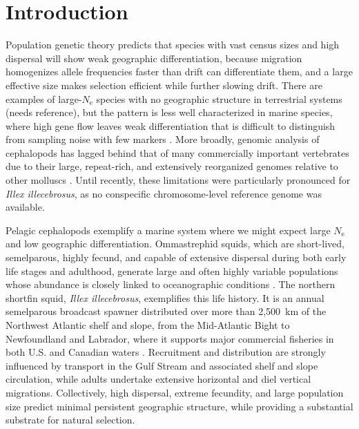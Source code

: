 \documentclass[11pt]{article}
\newcommand{\illex}{\textit{Illex illecebrosus}}
\newcommand{\Ne}{N_\mathrm{e}}
\newcommand{\comment}[1]{{\color{orange} #1}}
\begin{document}
\begin{abstract}
\end{abstract}

\section{Introduction}

Population genetic theory predicts that species with vast census sizes and high dispersal will show weak geographic differentiation, because migration homogenizes allele frequencies faster than drift can differentiate them, and a large effective size makes selection efficient while further slowing drift. There are examples of large-$\Ne$ species with no geographic structure in terrestrial systems \comment{(needs reference)}, but the pattern is less well characterized in marine species, where high gene flow leaves weak differentiation that is difficult to distinguish from sampling noise with few markers \citep{waples1998,hauser2008,gagnaire2015}.
More broadly, genomic analysis of cephalopods has lagged behind that of many commercially important vertebrates due to their large, repeat-rich, and extensively reorganized genomes relative to other molluscs \citep{albertin2015,albertin2022,schmidbaur2022,coffing2025,coffing2026,small2026}. Until recently, these limitations were particularly pronounced for \illex{}, as no conspecific chromosome-level reference genome was available.

Pelagic cephalopods exemplify a marine system where we might expect large $\Ne$ and low geographic differentiation. Ommastrephid squids, which are short-lived, semelparous, highly fecund, and capable of extensive dispersal during both early life stages and adulthood, generate large and often highly variable populations whose abundance is closely linked to oceanographic conditions \citep{odor1998,arkhipkin2015}. The northern shortfin squid, \illex{}, exemplifies this life history. It is an annual semelparous broadcast spawner distributed over more than 2{,}500~km of the Northwest Atlantic shelf and slope, from the Mid-Atlantic Bight to Newfoundland and Labrador, where it supports major commercial fisheries in both U.S. and Canadian waters \citep{odor1998,arkhipkin2015,baker2025}. Recruitment and distribution are strongly influenced by transport in the Gulf Stream and associated shelf and slope circulation, while adults undertake extensive horizontal and diel vertical migrations. Collectively, high dispersal, extreme fecundity, and large population size predict minimal persistent geographic structure, while providing a substantial substrate for natural selection. 
\end{document}
